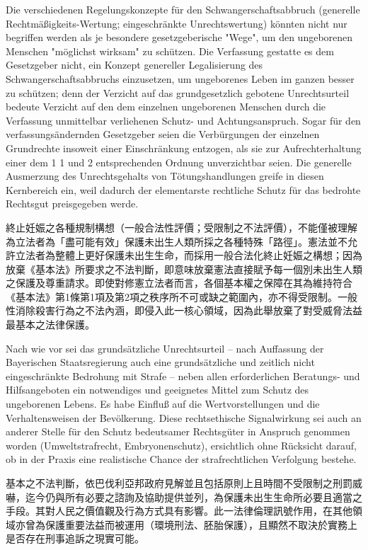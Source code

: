 \documentclass[12pt]{article}
\begin{document}
\begin{sourcepara}[title={原文理由 C.II.1 開頭} Rn 113]
Die verschiedenen Regelungskonzepte für den Schwangerschaftsabbruch (generelle Rechtmäßigkeits-Wertung; eingeschränkte Unrechtswertung) könnten nicht nur begriffen werden als je besondere gesetzgeberische "Wege", um den ungeborenen Menschen "möglichst wirksam" zu schützen. Die Verfassung gestatte es dem Gesetzgeber nicht, ein Konzept genereller Legalisierung des Schwangerschaftsabbruchs einzusetzen, um ungeborenes Leben im ganzen besser zu schützen; denn der Verzicht auf das grundgesetzlich gebotene Unrechtsurteil bedeute Verzicht auf den dem einzelnen ungeborenen Menschen durch die Verfassung unmittelbar verliehenen Schutz- und Achtungsanspruch. Sogar für den verfassungsändernden Gesetzgeber seien die Verbürgungen der einzelnen Grundrechte insoweit einer Einschränkung entzogen, als sie zur Aufrechterhaltung einer dem \abbrArt{} 1 \abbrAbs{} 1 und 2 \abbrGG{} entsprechenden Ordnung unverzichtbar seien. Die generelle Ausmerzung des Unrechtsgehalts von Tötungshandlungen greife in diesen Kernbereich ein, weil dadurch der elementarste rechtliche Schutz für das bedrohte Rechtsgut preisgegeben werde.
\end{sourcepara}
\begin{transpara}
終止妊娠之各種規制構想（一般合法性評價；受限制之不法評價），不能僅被理解為立法者為「盡可能有效」保護未出生人類所採之各種特殊「路徑」。憲法並不允許立法者為整體上更好保護未出生生命，而採用一般合法化終止妊娠之構想；因為放棄《基本法》所要求之不法判斷，即意味放棄憲法直接賦予每一個別未出生人類之保護及尊重請求。即使對修憲立法者而言，各個基本權之保障在其為維持符合《基本法》第1條第1項\ggfnArtOneOneZH{}及第2項之秩序所不可或缺之範圍內，亦不得受限制。一般性消除殺害行為之不法內涵，即侵入此一核心領域，因為此舉放棄了對受威脅法益最基本之法律保護。
\end{transpara}

\begin{sourcepara}[title={原文理由 C.II.1 開頭} Rn 114]
Nach wie vor sei das grundsätzliche Unrechtsurteil -- nach Auffassung der Bayerischen Staatsregierung auch eine grundsätzliche und zeitlich nicht eingeschränkte Bedrohung mit Strafe -- neben allen erforderlichen Beratungs- und Hilfsangeboten ein notwendiges und geeignetes Mittel zum Schutz des ungeborenen Lebens. Es habe Einfluß auf die Wertvorstellungen und die Verhaltensweisen der Bevölkerung. Diese rechtsethische Signalwirkung sei auch an anderer Stelle für den Schutz bedeutsamer Rechtsgüter in Anspruch genommen worden (Umweltstrafrecht, Embryonenschutz), ersichtlich ohne Rücksicht darauf, ob in der Praxis eine realistische Chance der strafrechtlichen Verfolgung bestehe.
\end{sourcepara}
\begin{transpara}
基本之不法判斷，依巴伐利亞邦政府見解並且包括原則上且時間不受限制之刑罰威嚇，迄今仍與所有必要之諮詢及協助提供並列，為保護未出生生命所必要且適當之手段。其對人民之價值觀及行為方式具有影響。此一法律倫理訊號作用，在其他領域亦曾為保護重要法益而被運用（環境刑法、胚胎保護），且顯然不取決於實務上是否存在刑事追訴之現實可能。
\end{transpara}
\end{document}

